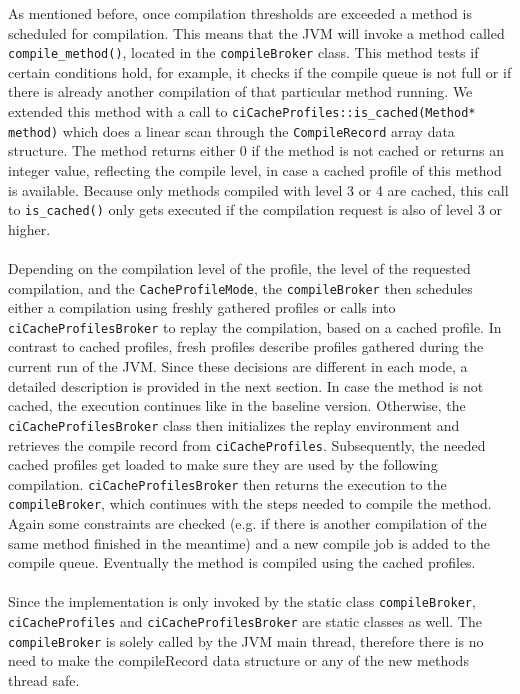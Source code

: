 As mentioned before, once compilation thresholds are exceeded a method is scheduled for compilation. This means that the JVM will invoke a method called \texttt{compile\_method()}, located in the \texttt{compileBroker} class. This method tests if certain conditions hold, for example, it checks if the compile queue is not full or if there is already another compilation of that particular method running.
We extended this method with a call to \texttt{ciCacheProfiles::is\_cached(Method* method)} which does a linear scan through the \texttt{CompileRecord} array data structure. The method returns either 0 if the method is not cached or returns an integer value, reflecting the compile level, in case a cached profile of this method is available. Because only methods compiled with level 3 or 4 are cached, this call to \texttt{is\_cached()} only gets executed if the compilation request is also of level 3 or higher.\\\\
Depending on the compilation level of the profile, the level of the requested compilation, and the \texttt{CacheProfileMode}, the \texttt{compileBroker} then schedules either a compilation using freshly gathered profiles or calls into \texttt{ciCacheProfilesBroker} to replay the compilation, based on a cached profile. In contrast to cached profiles, fresh profiles describe profiles gathered during the current run of the JVM. Since these decisions are different in each mode, a detailed description is provided in the next section.
In case the method is not cached, the execution continues like in the baseline version.
Otherwise, the \texttt{ciCacheProfilesBroker} class then initializes the replay environment and retrieves the compile record from \texttt{ciCacheProfiles}. Subsequently, the needed cached profiles get loaded to make sure they are used by the following compilation. \texttt{ciCacheProfilesBroker} then returns the execution to the \texttt{compileBroker}, which continues with the steps needed to compile the method. Again some constraints are checked (e.g. if there is another compilation of the same method finished in the meantime) and a new compile job is added to the compile queue. Eventually the method is compiled using the cached profiles.
\\\\
Since the implementation is only invoked by the static class \texttt{compileBroker}, \texttt{ciCacheProfiles} and \texttt{ciCacheProfilesBroker} are static classes as well. The \texttt{compileBroker} is solely called by the JVM main thread, therefore there is no need to make the compileRecord data structure or any of the new methods thread safe. 

